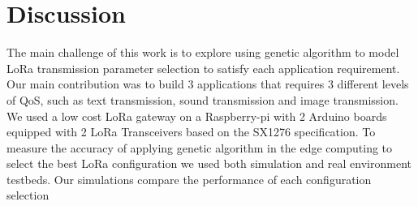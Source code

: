 \section{Discussion} \label{sec:Conclusion}

The main challenge of this work is to explore using genetic algorithm to model LoRa transmission parameter selection to satisfy each application requirement.
Our main contribution was to build 3 applications that requires 3 different levels of QoS,
	such as text transmission, sound transmission and image transmission. 
We used a low cost LoRa gateway on a Raspberry-pi with 2 Arduino boards equipped with 2 LoRa Transceivers  based on the SX1276 specification.
To measure the accuracy of applying genetic algorithm in the edge computing to select the best LoRa configuration we used both simulation and real environment testbeds.
Our simulations compare the performance of each configuration selection 


